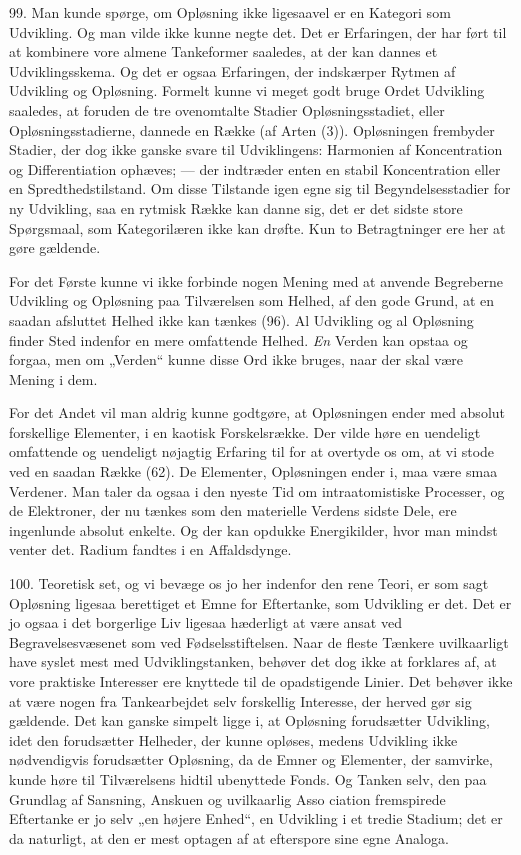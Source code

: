 \documentclass[12pt,a4paper]{book}
\newcommand{\opage}[1]{\marginnote{\footnotesize\textit{[#1]}}}
\newcommand{\apage}[1]{\marginnote{\footnotesize\textit{[#1]}}}
\begin{document}
99. Man kunde spørge, om Opløsning ikke ligesaavel er en Kategori som Udvikling.
Og man vilde ikke kunne negte det. Det er Erfaringen, der har ført til at
kombinere vore almene Tankeformer saaledes, at der kan dannes et Udviklingsskema.
Og det er ogsaa Erfaringen, der indskærper Rytmen af Udvikling og Opløsning.
Formelt kunne vi meget godt bruge Ordet Udvikling saaledes, at foruden de tre
ovenomtalte Stadier Opløsningsstadiet, eller Opløsningsstadierne, dannede en
Række (af Arten (3)). Opløsningen frembyder Stadier, der dog ikke ganske svare til
Udviklingens: Harmonien af Koncentration og Differentiation ophæves; --- der
indtræder enten en stabil Koncentration eller en Spredthedstilstand. Om disse
Tilstande igen egne sig til Begyndelsesstadier for ny Udvikling, saa en rytmisk
Række kan danne sig, det er det sidste store Spørgsmaal, som \apage{235} Kategorilæren ikke
kan drøfte. Kun to Betragtninger ere her at gøre gældende.

For det Første kunne vi ikke forbinde nogen Mening med at anvende Begreberne
Udvikling og Opløsning paa Tilværelsen som Helhed, af den gode Grund, at en saadan
afsluttet Helhed ikke kan tænkes (96). Al Udvikling og al Opløsning finder Sted
indenfor en mere omfattende Helhed. \emph{En} Verden kan opstaa og forgaa, men om
„Verden“ kunne disse Ord ikke bruges, naar der skal være Mening i dem.

For det Andet vil man aldrig kunne godtgøre, at Opløsningen ender med absolut
forskellige Elementer, i en kaotisk Forskelsrække. Der vilde høre en uendeligt
omfattende og uendeligt nøjagtig Erfaring til for at overtyde os om, at vi stode
ved en saadan Række (62). De Elementer, Opløsningen ender i, maa være smaa
Verdener. Man taler da ogsaa i den nyeste Tid om intraatomistiske Processer, og de
Elektroner, der nu tænkes som den materielle Verdens sidste Dele, ere ingenlunde
absolut enkelte. Og der kan opdukke Energikilder, hvor man mindst venter det.
Radium fandtes i en Affaldsdynge.

100. Teoretisk set, og vi bevæge os jo her indenfor den rene Teori, er som sagt
Opløsning ligesaa berettiget et Emne for Eftertanke, som Udvikling er det. Det er
jo ogsaa i det borgerlige Liv ligesaa hæderligt at være ansat ved
Begravelsesvæsenet som ved Fødselsstiftelsen. Naar de fleste Tænkere uvilkaarligt
have syslet mest med Udviklingstanken, behøver det dog ikke at forklares af, at
vore praktiske Interesser ere knyttede til de opadstigende Linier. Det behøver
ikke at være nogen fra Tankearbejdet selv forskellig Interesse, der herved gør sig
gældende. Det kan ganske simpelt ligge i, at Opløsning forudsætter Udvikling, idet
den forudsætter Helheder, der kunne opløses, medens Udvikling ikke nødvendigvis
forudsætter Opløsning, da de Emner og Elementer, der samvirke, kunde høre til
Tilværelsens hidtil ubenyttede Fonds. Og Tanken selv, den paa Grundlag af
Sansning, Anskuen og uvilkaarlig Asso%
\opage{236}ciation fremspirede Eftertanke er jo selv „en
højere Enhed“, en Udvikling i et tredie Stadium; det er da naturligt, at den er
mest optagen af at efterspore sine egne Analoga.
\end{document}
